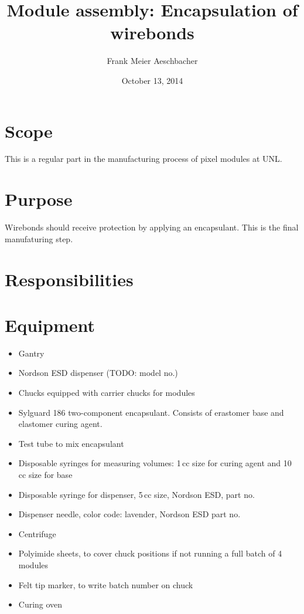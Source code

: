 \documentclass[12pt]{unlsilabsop}
\title{Module assembly: Encapsulation of wirebonds}
\date{October 13, 2014}
\author{Frank Meier Aeschbacher}
\begin{document}
\maketitle

\section{Scope}
This is a regular part in the manufacturing process of pixel modules at UNL.

\section{Purpose}
Wirebonds should receive protection by applying an encapsulant. This is the final manufaturing step.


\section{Responsibilities}

\section{Equipment}

\begin{itemize}
    \item Gantry
    \item Nordson ESD dispenser (TODO: model no.)
    \item Chucks equipped with carrier chucks for modules
    \item Sylguard 186 two-component encapsulant. Consists of erastomer base and elastomer curing agent.
    \item Test tube to mix encapsulant
    \item Disposable syringes for measuring volumes: 1\,cc size for curing agent and 10\,cc size for base
    \item Disposable syringe for dispenser, 5\,cc size, Nordson ESD, part no.
    \item Dispenser needle, color code: lavender, Nordson ESD part no.
    \item Centrifuge
    \item Polyimide sheets, to cover chuck positions if not running a full batch of 4 modules
    \item Felt tip marker, to write batch number on chuck
    \item Curing oven
\end{itemize}
\end{document}
